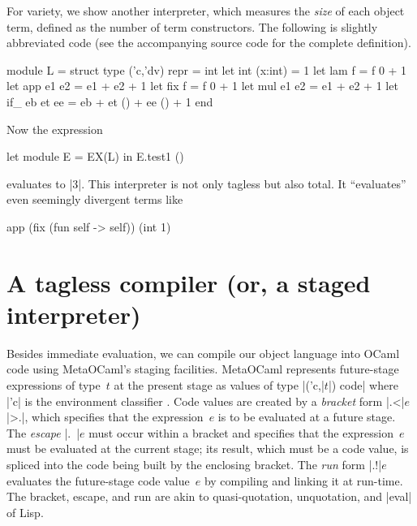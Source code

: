 \documentclass[preprint]{sigplanconf}
\begin{document}
For variety, we show another interpreter, which measures the \emph{size}
of each object term, defined as the number of term
constructors. The following is slightly abbreviated code (see the
accompanying source code for the complete definition).
\begin{code}
module L = struct
  type ('c,'dv) repr = int
  let int (x:int)  = 1
  let lam f        = f 0 + 1
  let app e1 e2    = e1 + e2 + 1
  let fix f        = f 0 + 1
  let mul e1 e2    = e1 + e2 + 1
  let if_ eb et ee = eb + et () + ee () + 1
end
\end{code}
Now the expression
\begin{code}
let module E = EX(L) in E.test1 ()
\end{code}
evaluates to |3|. This interpreter is not only tagless but also
total. It ``evaluates'' even seemingly divergent terms like
\begin{code}
app (fix (fun self -> self)) (int 1)
\end{code}

\begin{comment}
module EX1(S: Symantics) = struct
 open S
 let tfix () = app (fix (fun self -> self)) (int 1)
end;;
let module E =EX1(R) in E.tfix ();;
let module E =EX1(L) in E.tfix ();;
\end{comment}

\section{A tagless compiler (or, a staged interpreter)}\label{compiler}

Besides immediate evaluation, we can compile our object language
into OCaml code using MetaOCaml's staging facilities. MetaOCaml
represents future-stage expressions of type~$t$ at the
present stage as values of type |('c,|$t$|) code| where |'c| is the
environment classifier \citep{WalidPOPL03,calcagno-ml-like}. Code values are created
by a \emph{bracket} form |.<|$e$|>.|, which specifies that the expression~$e$ is to be
evaluated at a future stage. The \emph{escape} |.~|$e$ must occur
within a bracket and specifies that the expression~$e$ must be evaluated
at the current stage; its result, which must be a code value, is
spliced into the code being built by the enclosing bracket. The \emph{run} form |.!|$e$ evaluates
the future-stage code value~$e$ by compiling and linking it at run-time.
The bracket, escape, and run are akin to
quasi-quotation, unquotation, and |eval| of Lisp.
\end{document}
